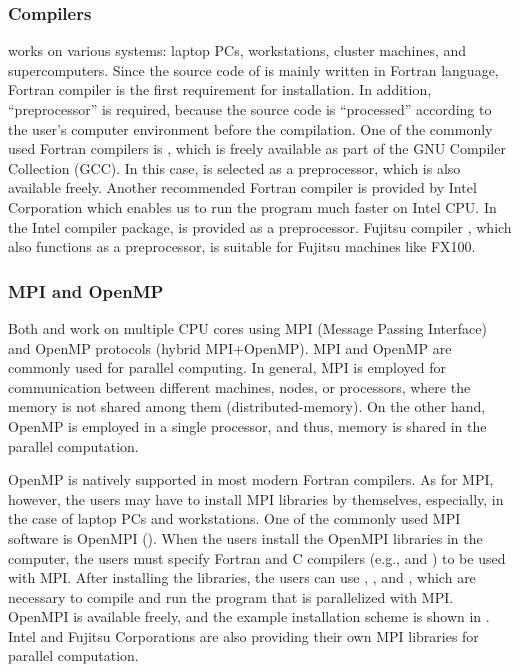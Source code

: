 \documentclass[a4paper,11pt,oneside,english]{sphinxmanual}
\begin{document}
\subsubsection{Compilers}
\label{\detokenize{01_Getting_Started:compilers}}
 works on various systems: laptop PCs, workstations, cluster machines, and supercomputers.
Since the source code of  is mainly written in
Fortran language, Fortran compiler is the first requirement for installation.
In addition, “preprocessor” is required, because the source code is
“processed” according to the user’s computer environment before the compilation.
One of the commonly used Fortran compilers is , which
is freely available as part of the GNU Compiler Collection (GCC).
In this case,  is selected as a preprocessor, which is also available freely.
Another recommended Fortran compiler is  provided
by Intel Corporation which enables us to run the program much faster on Intel CPU.
In the Intel compiler package,  is provided as a preprocessor.
Fujitsu compiler , which also functions as a preprocessor,
is suitable for Fujitsu machines like FX100.


\subsubsection{MPI and OpenMP}
\label{\detokenize{01_Getting_Started:mpi-and-openmp}}
Both  and  work on multiple CPU cores using MPI
(Message Passing Interface) and OpenMP protocols (hybrid MPI+OpenMP).
MPI and OpenMP are commonly used for parallel computing.
In general, MPI is employed for communication between different machines,
nodes, or processors, where the memory is not shared among them (distributed-memory).
On the other hand, OpenMP is employed in a single processor, and thus,
memory is shared in the parallel computation.

OpenMP is natively supported in most modern Fortran compilers.
As for MPI, however, the users may have to install MPI libraries by
themselves, especially, in the case of laptop PCs and workstations.
One of the commonly used MPI software is OpenMPI ().
When the users install the OpenMPI libraries in the computer, the users must
specify Fortran and C compilers (e.g.,  and ) to be used with MPI.
After installing the libraries, the users can use , , and ,
which are necessary to compile and run the program that is parallelized with MPI.
OpenMPI is available freely, and the example installation scheme is shown in {\hyperref[\detokenize{98_Appendix:appendix}]{}}.
Intel and Fujitsu Corporations are also providing their own MPI libraries for parallel computation.
\end{document}
